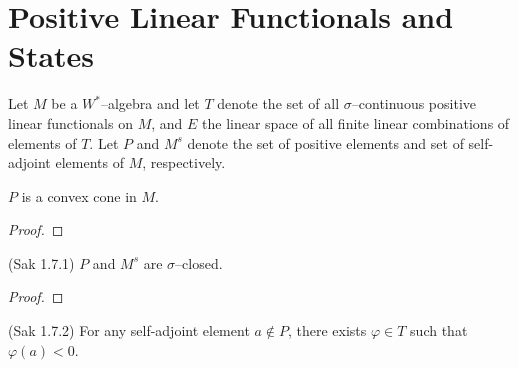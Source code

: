 \chapter{Positive Linear Functionals and States}




Let $M$ be a $W^{*}$--algebra and let $T$ denote the set of all $\sigma$--continuous positive
linear functionals on $M$, and $E$ the linear space of all finite linear combinations
of elements of $T$. Let $P$ and $M^{s}$ denote the set of positive elements and set of self-adjoint elements of $M$, respectively.

\begin{lemma}
  \label{lem:pos_cvx_cone}
  \mathlibok
  $P$ is a convex cone in $M$.
\end{lemma}

\begin{proof}
  \leanok
\end{proof}

\begin{lemma}
  \label{lem:pos_sa_sigma_closed_Sak_1_7_1} (Sak 1.7.1)
  \leanok
  $P$ and $M^{s}$ are $\sigma$--closed.
\end{lemma}

\begin{proof}
  \leanok
\end{proof}

\begin{lemma}
  \label{lem:non_pos_elem_neg_for_some_state_Sak_1_7_2} (Sak 1.7.2)
  \leanok
  For any self-adjoint element $a\notin P$, there exists $\varphi\in T$
  such that $\varphi(a)<0$.
\end{lemma}

